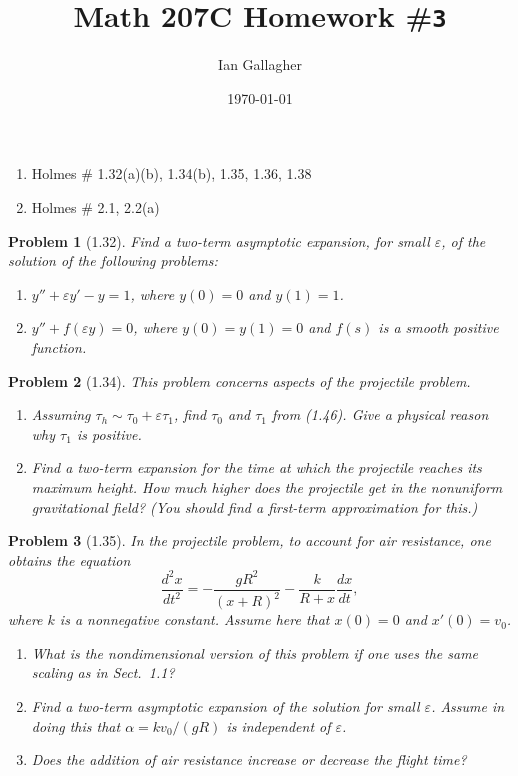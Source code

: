 \documentclass[11pt]{article}
\title{Math 207C Homework \#\texttt{3}}
\author{Ian Gallagher}
\date{\today}
\theoremstyle{problemstyle}
\newtheorem{problem}{Problem}
\begin{document}
\maketitle
\begin{enumerate}[label=(\arabic*)]
    \item Holmes \# 1.32(a)(b), 1.34(b), 1.35, 1.36, 1.38
    \item Holmes \# 2.1, 2.2(a)
\end{enumerate}


\begin{problem}[1.32]
Find a two-term asymptotic expansion, for small $\varepsilon$, of the solution
of the following problems:
  \begin{enumerate}
      \item $y'' + \varepsilon y' - y = 1$, where $y(0) = 0$ and $y(1) = 1$.
      \item $y'' + f(\varepsilon y) = 0$, where $y(0) = y(1) = 0$ and $f(s)$ is
        a smooth positive function.
  \end{enumerate}
\end{problem}


\begin{problem}[1.34]
This problem concerns aspects of the projectile problem.
  \begin{enumerate}
      \item Assuming $\tau_h \sim \tau_0 + \varepsilon \tau_1$, find $\tau_0$
        and $\tau_1$ from (1.46). Give a physical reason why $\tau_1$ is
        positive.
      \item Find a two-term expansion for the time at which the projectile
        reaches its maximum height. How much higher does the projectile get in
        the nonuniform gravitational field? (You should find a first-term
        approximation for this.)
  \end{enumerate}
\end{problem}

\begin{problem}[1.35]
In the projectile problem, to account for air resistance, one obtains the
equation
\[
\frac{d^2x}{dt^2} = -\frac{gR^2}{(x + R)^2} - \frac{k}{R + x} \frac{dx}{dt},
\]
where $k$ is a nonnegative constant. Assume here that $x(0) = 0$ and $x'(0) =
v_0$.
  \begin{enumerate}
      \item What is the nondimensional version of this problem if one uses the
        same scaling as in Sect.~1.1?
      \item Find a two-term asymptotic expansion of the solution for small
        $\varepsilon$. Assume in doing this that $\alpha = kv_0/(gR)$ is
        independent of $\varepsilon$.
      \item Does the addition of air resistance increase or decrease the flight
        time?
  \end{enumerate}
\end{problem}
\end{document}
